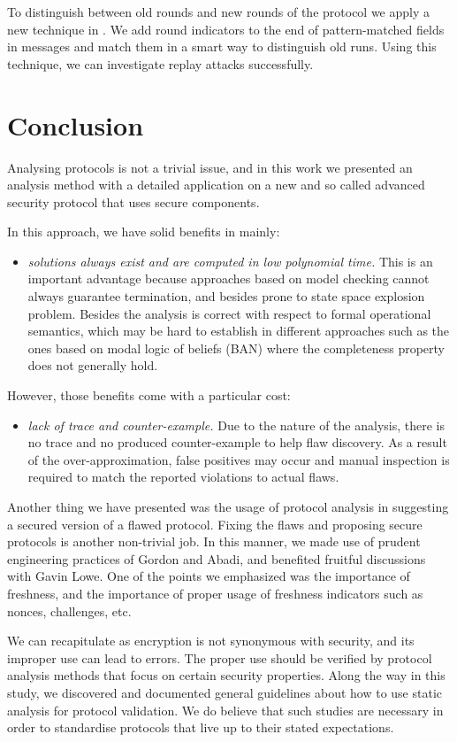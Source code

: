 To distinguish between old rounds and new rounds of the protocol we apply a new technique in \LYSA. 
We add round indicators to the end of pattern-matched fields in messages and match them in a smart way to distinguish old runs. 
Using this technique, we can investigate replay attacks successfully.

\section{Conclusion}
Analysing protocols is not a trivial issue, and in this work we
presented an analysis method with a detailed application on a new and so called
advanced security protocol that uses secure components. 

In this approach, we have solid benefits in mainly:
\begin{itemize}
\item \emph{solutions always exist and are computed in low polynomial
    time.} This is an important advantage because approaches based on
  model checking cannot always guarantee termination, and besides
  prone to state space explosion problem. Besides the analysis is
  correct with respect to formal operational semantics, which may be hard
  to establish in different approaches such as the ones based on modal
  logic of beliefs (BAN) where the completeness property does not
  generally hold.
\end{itemize}

However, those benefits come with a particular cost:
\begin{itemize}
\item \emph{lack of trace and counter-example.} Due to the nature of
  the analysis, there is no trace and no produced counter-example to
  help flaw discovery. As a result of the over-approximation, false
  positives may occur and manual inspection is required to match the
  reported violations to actual flaws.
\end{itemize}

Another thing we have presented was the usage of protocol analysis in
suggesting a secured version of a flawed protocol. Fixing the flaws
and proposing secure protocols is another non-trivial job. In this manner, we
made use of prudent engineering practices of Gordon and Abadi, and
benefited fruitful discussions with Gavin Lowe. One of the points we
emphasized was the importance of freshness, and the importance of
proper usage of freshness indicators such as nonces, challenges, etc.

We can recapitulate as encryption is not synonymous with security,
and its improper use can lead to errors. The proper use should be 
verified by protocol analysis methods that focus on certain security
properties. Along the way in this study, we discovered and documented general
guidelines about how to use static analysis for protocol
validation. We do believe that such studies are necessary in order
to standardise protocols that live up to their stated
expectations.